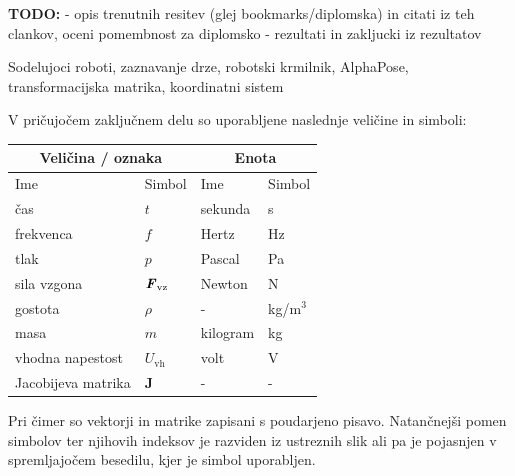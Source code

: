 \documentclass[a4paper,twoside,openright,12pt,slovene]{book}
\begin{document}
\textbf{TODO:} 
- opis trenutnih resitev (glej bookmarks/diplomska) in citati iz teh clankov, oceni pomembnost za diplomsko
- rezultati in zakljucki iz rezultatov

\kljucnebesede
Sodelujoci roboti, zaznavanje drze, robotski krmilnik, AlphaPose, transformacijska matrika, koordinatni sistem

\tableofcontents

\seznamslik
\seznamtabel

\seznamsimbolov
V pričujočem zaključnem delu so uporabljene naslednje veličine in simboli:

\begin{center}
    \begin{tabular}{*{4}{l}} \hline
        \multicolumn{2}{c}{\bf{Veličina / oznaka}}           & \multicolumn{2}{c}{\bf{Enota}} \\ \hline
        Ime                & Simbol                          & Ime      & Simbol              \\ \hline
        čas                & $t$                             & sekunda  & s                   \\
        frekvenca          & $f$                             & Hertz    & Hz                  \\
        tlak               & $p$                             & Pascal   & Pa                  \\
        sila vzgona        & $\textbf{\textit{F}}_\text{vz}$ & Newton   & N                   \\
        gostota            & $\rho$                          & -        & kg/m$^3$            \\
        masa               & $m$                             & kilogram & kg                  \\
        vhodna napestost   & $U_\text{vh}$                   & volt     & V                   \\
        Jacobijeva matrika & $\mathbf{J}$                    & -        & -                   \\ \hline
    \end{tabular}
\end{center}

Pri čimer so vektorji in matrike zapisani s poudarjeno pisavo. Natančnejši pomen simbolov ter njihovih indeksov je razviden iz ustreznih slik ali pa je pojasnjen v spremljajočem besedilu, kjer je simbol uporabljen.
\end{document}

